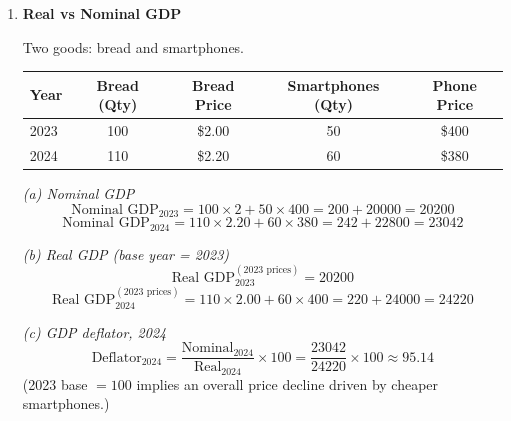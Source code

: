 \documentclass[12pt]{article}
\newcommand{\bn}{\bigskip\noindent}
\begin{document}
\begin{enumerate}
\bigskip

\item \textbf{Real vs Nominal GDP}

Two goods: bread and smartphones.

\begin{center}
\begin{tabular}{lcccc}
\toprule
Year & Bread (Qty) & Bread Price & Smartphones (Qty) & Phone Price \\
\midrule
2023 & 100 & \$2.00 & 50 & \$400 \\
2024 & 110 & \$2.20 & 60 & \$380 \\
\bottomrule
\end{tabular}
\end{center}

\bn \textit{(a) Nominal GDP}
\[
\text{Nominal GDP}_{2023} = 100\times 2 + 50\times 400 = 200 + 20000 = \boxed{20200}
\]
\[
\text{Nominal GDP}_{2024} = 110\times 2.20 + 60\times 380 = 242 + 22800 = \boxed{23042}
\]

\bn \textit{(b) Real GDP (base year = 2023)}
\[
\text{Real GDP}_{2023}^{(2023\text{ prices})} = \boxed{20200}
\]
\[
\text{Real GDP}_{2024}^{(2023\text{ prices})}
= 110\times 2.00 + 60\times 400 = 220 + 24000 = \boxed{24220}
\]

\bn \textit{(c) GDP deflator, 2024}
\[
\text{Deflator}_{2024} = \frac{\text{Nominal}_{2024}}{\text{Real}_{2024}} \times 100
= \frac{23042}{24220}\times 100 \approx \boxed{95.14}
\]
(2023 base $=100$ implies an overall price decline driven by cheaper smartphones.)

\end{enumerate}
\end{document}
